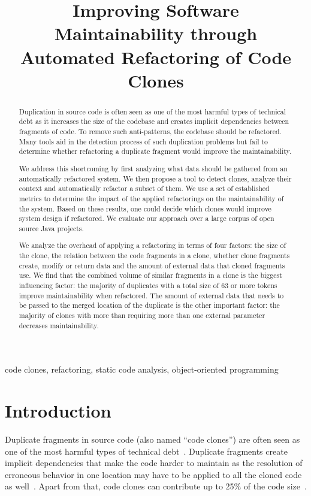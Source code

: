 \documentclass[conference]{IEEEtran}
\begin{document}
\title{Improving Software Maintainability through Automated Refactoring of Code Clones}

\maketitle

\begin{abstract}
Duplication in source code is often seen as one of the most harmful types of technical debt as it increases the size of the codebase and creates implicit dependencies between fragments of code. To remove such anti-patterns, the codebase should be refactored. Many tools aid in the detection process of such duplication problems but fail to determine whether refactoring a duplicate fragment would improve the maintainability.

We address this shortcoming by first analyzing what data should be gathered from an automatically refactored system. We then propose a tool to detect clones, analyze their context and automatically refactor a subset of them. We use a set of established metrics to determine the impact of the applied refactorings on the maintainability of the system. Based on these results, one could decide which clones would improve system design if refactored. We evaluate our approach over a large corpus of open source Java projects.

We analyze the overhead of applying a refactoring in terms of four factors: the size of the clone, the relation between the code fragments in a clone, whether clone fragments create, modify or return data and the amount of external data that cloned fragments use. We find that the combined volume of similar fragments in a clone is the biggest influencing factor: the majority of duplicates with a total size of 63 or more tokens improve maintainability when refactored. The amount of external data that needs to be passed to the merged location of the duplicate is the other important factor: the majority of clones with more than requiring more than one external parameter decreases maintainability.
\end{abstract}

\begin{IEEEkeywords}
code clones, refactoring, static code analysis, object-oriented programming
\end{IEEEkeywords}

\section{Introduction}
Duplicate fragments in source code (also named ``code clones'') are often seen as one of the most harmful types of technical debt~\cite{fowler2018refactoring}. Duplicate fragments create implicit dependencies that make the code harder to maintain as the resolution of erroneous behavior in one location may have to be applied to all the cloned code as well~\cite{ostberg2014automatically}. Apart from that, code clones can contribute up to 25\% of the code size~\cite{bruntink2005use}.
\end{document}
